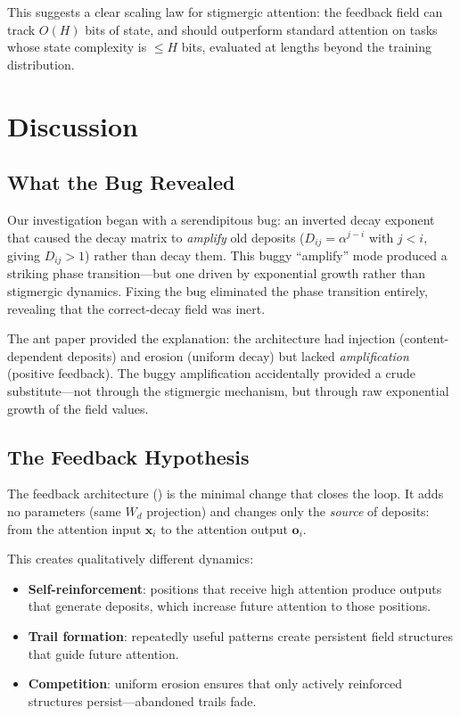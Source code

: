 \documentclass[11pt,a4paper]{article}
\newcommand{\retain}{\alpha}
\newcommand{\x}{\bm{x}}
\begin{document}
This suggests a clear scaling law for stigmergic attention: the
feedback field can track $O(H)$ bits of state, and should outperform
standard attention on tasks whose state complexity is $\leq H$ bits,
evaluated at lengths beyond the training distribution.


\section{Discussion}
\label{sec:discussion}

\subsection{What the Bug Revealed}

Our investigation began with a serendipitous bug: an inverted decay
exponent that caused the decay matrix to \emph{amplify} old deposits
($D_{ij} = \retain^{j-i}$ with $j < i$, giving $D_{ij} > 1$) rather
than decay them. This buggy ``amplify'' mode produced a striking phase
transition---but one driven by exponential growth rather than
stigmergic dynamics. Fixing the bug eliminated the phase transition
entirely, revealing that the correct-decay field was inert.

The ant paper provided the explanation: the architecture had injection
(content-dependent deposits) and erosion (uniform decay) but lacked
\emph{amplification} (positive feedback). The buggy amplification
accidentally provided a crude substitute---not through the stigmergic
mechanism, but through raw exponential growth of the field values.

\subsection{The Feedback Hypothesis}

The feedback architecture () is the minimal change
that closes the loop. It adds no parameters (same $W_d$ projection)
and changes only the \emph{source} of deposits: from the attention
input $\x_i$ to the attention output $\bm{o}_i$.

This creates qualitatively different dynamics:
\begin{itemize}
    \item \textbf{Self-reinforcement}: positions that receive high
          attention produce outputs that generate deposits, which
          increase future attention to those positions.
    \item \textbf{Trail formation}: repeatedly useful patterns create
          persistent field structures that guide future attention.
    \item \textbf{Competition}: uniform erosion ensures that only
          actively reinforced structures persist---abandoned trails
          fade.
\end{itemize}
\end{document}
